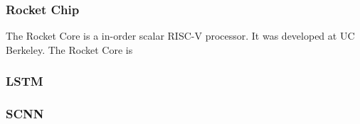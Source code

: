 \documentclass[../main.tex]{subfiles}
\begin{document}
\subsubsection{Rocket Chip}
The Rocket Core is a in-order scalar RISC-V processor. It was developed at UC Berkeley. The Rocket Core is 
\subsubsection{LSTM}
\blindtext
\subsubsection{SCNN}
\blindtext
\end{document}
